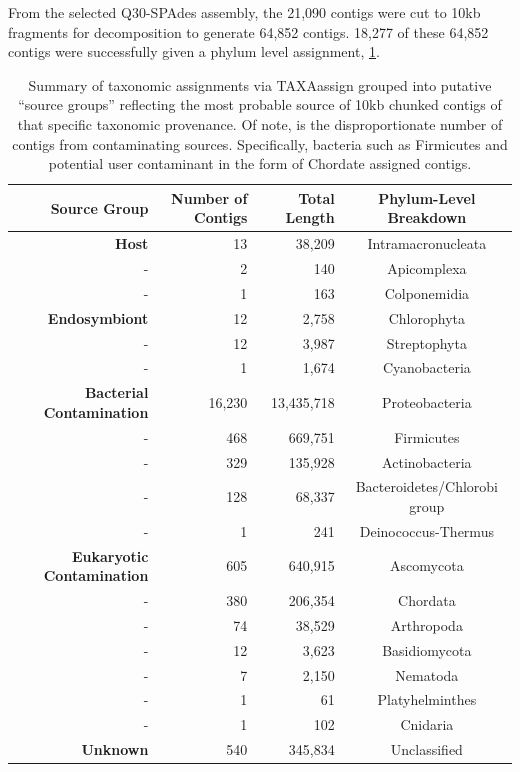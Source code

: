 From the selected Q30-SPAdes assembly, the 21,090 contigs
were cut to 10kb fragments for decomposition to generate 64,852 contigs. 
18,277 of these 64,852 contigs were successfully given a
phylum level assignment, \cref{tab:genome_taxassign}.


\begin{table}
	\begin{tabular}{| r | r r c |}
\hline
\textbf{Source Group} & \textbf{Number of Contigs} & \textbf{Total Length} & \textbf{Phylum-Level Breakdown} \\
\hline
\textbf{Host} & 13 & 38,209 & Intramacronucleata\\
- & 2 & 140 & Apicomplexa\\
- & 1 & 163 & Colponemidia \\
\hline 
\textbf{Endosymbiont} & 12 & 2,758 & Chlorophyta\\
- &  12 & 3,987 & Streptophyta\\
- &  1 & 1,674  & Cyanobacteria\\
\hline
\textbf{Bacterial Contamination} & 16,230 & 13,435,718 & Proteobacteria \\
- & 468 & 669,751 & Firmicutes\\
- & 329 & 135,928 & Actinobacteria\\
- & 128 & 68,337 & Bacteroidetes/Chlorobi group\\
- & 1 & 241 & Deinococcus-Thermus\\
\hline
\textbf{Eukaryotic Contamination} & 605 & 640,915 & Ascomycota \\
- & 380 & 206,354 & Chordata\\
- & 74 & 38,529  & Arthropoda \\
- & 12 & 3,623 &  Basidiomycota\\
- & 7  & 2,150 & Nematoda \\
- & 1 & 61 & Platyhelminthes\\
- & 1 & 102 & Cnidaria\\
\hline
\textbf{Unknown} & 540 & 345,834 & Unclassified \\
\hline
	\end{tabular}
    \caption[Taxonomic Assignment of Genomic Contigs]{Summary of taxonomic assignments via TAXAassign grouped into putative ``source groups'' reflecting
		the most probable source of 10kb chunked contigs of that specific taxonomic provenance.  Of note, is the disproportionate
		number of contigs from contaminating sources. Specifically, bacteria such as Firmicutes and potential
    user contaminant in the form of Chordate assigned contigs.}
	\label{tab:genome_taxassign}
\end{table}

